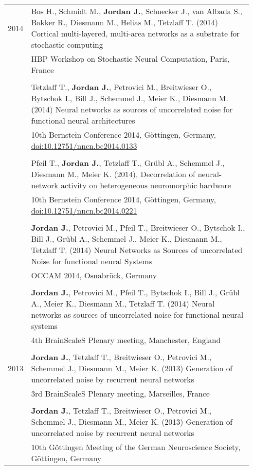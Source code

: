 \begin{longtable}{>{\hfill}p{1.6cm} p{}}
  2014 & Bos H., Schmidt M., \textbf{Jordan J.}, Schuecker J., van Albada S., Bakker R., Diesmann M., Helias M., Tetzlaff T. (2014) Cortical multi-layered, multi-area networks as a substrate for stochastic computing \\
  & \footnotesize HBP Workshop on Stochastic Neural Computation, Paris, France \\
  \multicolumn{2}{c}{} \\
  &  Tetzlaff T., \textbf{Jordan J.}, Petrovici M., Breitwieser O., Bytschok I., Bill J., Schemmel J., Meier K., Diesmann M. (2014) Neural networks as sources of uncorrelated noise for functional neural architectures \\
  & \footnotesize 10th Bernstein Conference 2014, G\"ottingen, Germany, \href{http://dx.doi.org/10.12751/nncn.bc2014.0133}{doi:10.12751/nncn.bc2014.0133} \\
  \multicolumn{2}{c}{} \\
  & Pfeil T., \textbf{Jordan J.}, Tetzlaff T., Gr\"ubl A., Schemmel J., Diesmann M., Meier K. (2014), Decorrelation of neural-network activity on heterogeneous neuromorphic hardware \\
  & \footnotesize 10th Bernstein Conference 2014, G\"ottingen, Germany, \href{http://dx.doi.org/10.12751/nncn.bc2014.0221}{doi:10.12751/nncn.bc2014.0221} \\
  \multicolumn{2}{c}{} \\
  & \textbf{Jordan J.}, Petrovici M., Pfeil T., Breitwieser O., Bytschok I., Bill J., Gr\"ubl A., Schemmel J., Meier K., Diesmann M., Tetzlaff T. (2014) Neural Networks as Sources of uncorrelated Noise for functional neural Systems \\
  & \footnotesize OCCAM 2014, Osnabr\"uck, Germany \\
  \multicolumn{2}{c}{} \\
  & \textbf{Jordan J.}, Petrovici M., Pfeil T., Bytschok I., Bill J., Gr\"ubl A., Meier K., Diesmann M., Tetzlaff T. (2014) Neural networks as sources of uncorrelated noise for functional neural systems \\
  & \footnotesize 4th BrainScaleS Plenary meeting, Manchester, England \\
  \multicolumn{2}{c}{} \\
  2013 & \textbf{Jordan J.}, Tetzlaff T., Breitwieser O., Petrovici M., Schemmel J., Diesmann M., Meier K. (2013) Generation of uncorrelated noise by recurrent neural networks \\
  & \footnotesize 3rd BrainScaleS Plenary meeting, Marseilles, France \\
  \multicolumn{2}{c}{} \\
  & \textbf{Jordan J.}, Tetzlaff T., Breitwieser O., Petrovici M., Schemmel J., Diesmann M., Meier K. (2013) Generation of uncorrelated noise by recurrent neural networks \\
  & \footnotesize 10th G\"ottingen Meeting of the German Neuroscience Society, G\"ottingen, Germany \\
\end{longtable}

